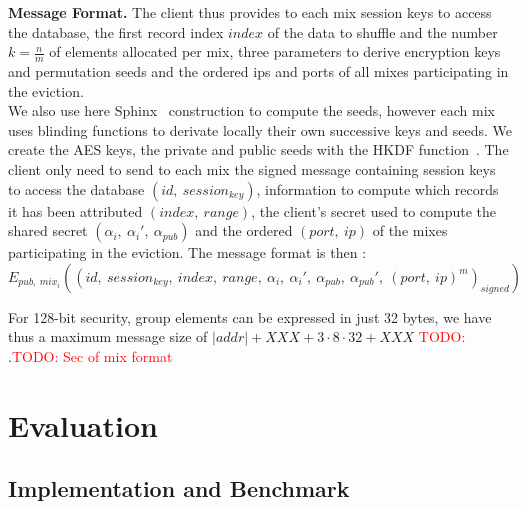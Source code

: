 \documentclass{llncs}
\newcommand{\todo}[1]{\textcolor{red}{TODO: #1}}
\begin{document}
\noindent\textbf{Message Format.}
The client thus provides to each mix session keys to access the database, the first record index $index$ of the data to shuffle and the number $k=\frac{n}{m}$ of elements allocated per mix, three parameters to derive encryption keys and permutation seeds and the ordered ips and ports of all mixes participating in the eviction.\\
We also use here Sphinx~\cite{danezis2009sphinx} construction to compute the seeds, however each mix uses blinding functions to derivate locally their own successive keys and seeds. \iffalse\\
Let $\kappa$ be the security parameter. We call $\mathcal{G}$ a prime order cyclic group satisfying the Decisional Diffie-Hellman Assumption. $\mathcal{G}^*$ is the set of non-identity elements of $\mathcal{G}$. The element $g$ is a generator of the group, and $q$ is the prime order of $\mathcal{G}$ with $q \approx 2^{2\kappa}$.\\
We suppose each mix owns a pair of keys ($\ priv_i \in \mathbb{Z}_{q}^*$, $pub_i=g^{priv_i}\in \mathcal{G}^*$). We assume the existence of a PKI that publishes a list of all ($mix_i$,\ $pub_i$) pair.
The client randomly chooses $x\in_\mathcal{R} \mathbb{Z}_q^*$ and sends to the mix $mix_i$ the element $\alpha_i=g^{x\cdot b_i}$ with $b_i$ a binding factors, the shared secret is then $s_i=pub_i^{x\cdot b_i}$.
\fi
We create the AES keys, the private and public seeds with the HKDF function~\cite{krawczyk2010cryptographic}. The client only need to send to each mix the signed message containing session keys to access the database $(id,\ session_{key})$, information to compute which records it has been attributed $(index,\ range)$, the client's secret used to compute the shared secret $(\alpha_i,\ \alpha_i',\ \alpha_{pub})$ and the ordered $(port,\ ip)$ of the mixes participating in the eviction.
The message format is then : $$E_{pub,\ mix_i}\left (\left(id,\ session_{key},\ index,\ range,\ \alpha_i,\ \alpha_i',\ \alpha_{pub},\ \alpha_{pub}',\ (port,\ ip)^m \right )_{signed}\right )$$

For 128-bit security, group elements can be expressed in just 32 bytes, we have thus a maximum message size of $|addr|+XXX + 3 \cdot 8 \cdot 32 + XXX$ \todo{}.\todo{Sec of mix format}


\section{Evaluation}\label{Evaluation}
\subsection{Implementation and Benchmark}\label{Implementation}
\end{document}
